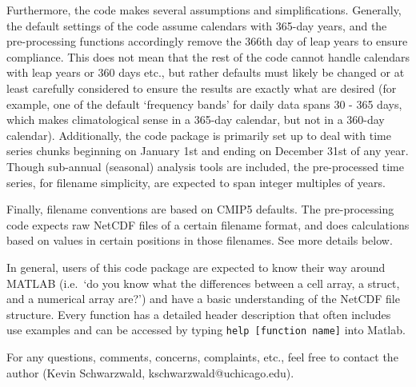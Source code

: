 \documentclass{article}
\begin{document}
Furthermore, the code makes several assumptions and simplifications. Generally, the default settings of the code assume calendars with 365-day years, and the pre-processing functions accordingly remove the 366th day of leap years to ensure compliance. This does not mean that the rest of the code cannot handle calendars with leap years or 360 days etc., but rather defaults must likely be changed or at least carefully considered to ensure the results are exactly what are desired (for example, one of the default `frequency bands' for daily data spans 30 - 365 days, which makes climatological sense in a 365-day calendar, but not in a 360-day calendar). Additionally, the code package is primarily set up to deal with time series chunks beginning on January 1st and ending on December 31st of any year. Though sub-annual (seasonal) analysis tools are included, the pre-processed time series, for filename simplicity, are expected to span integer multiples of years. 

Finally, filename conventions are based on CMIP5 defaults. The pre-processing code expects raw NetCDF files of a certain filename format, and does calculations based on values in certain positions in those filenames. See more details below. 

In general, users of this code package are expected to know their way around MATLAB (i.e.\ `do you know what the differences between a cell array, a struct, and a numerical array are?') and have a basic understanding of the NetCDF file structure. Every function has a detailed header description that often includes use examples and can be accessed by typing \texttt{help [function name]} into Matlab. 

For any questions, comments, concerns, complaints, etc., feel free to contact the author (Kevin Schwarzwald, kschwarzwald@uchicago.edu). 
\end{document}
